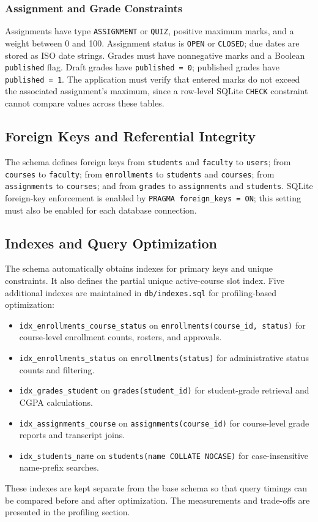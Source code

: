 \subsubsection{Assignment and Grade Constraints}
Assignments have type \texttt{ASSIGNMENT} or \texttt{QUIZ}, positive maximum marks, and a weight between 0 and 100. Assignment status is \texttt{OPEN} or \texttt{CLOSED}; due dates are stored as ISO date strings. Grades must have nonnegative marks and a Boolean \texttt{published} flag. Draft grades have \texttt{published = 0}; published grades have \texttt{published = 1}. The application must verify that entered marks do not exceed the associated assignment's maximum, since a row-level SQLite \texttt{CHECK} constraint cannot compare values across these tables.

\subsection{Foreign Keys and Referential Integrity}
The schema defines foreign keys from \texttt{students} and \texttt{faculty} to \texttt{users}; from \texttt{courses} to \texttt{faculty}; from \texttt{enrollments} to \texttt{students} and \texttt{courses}; from \texttt{assignments} to \texttt{courses}; and from \texttt{grades} to \texttt{assignments} and \texttt{students}. SQLite foreign-key enforcement is enabled by \texttt{PRAGMA foreign\_keys = ON}; this setting must also be enabled for each database connection.

\subsection{Indexes and Query Optimization}
The schema automatically obtains indexes for primary keys and unique constraints. It also defines the partial unique active-course slot index. Five additional indexes are maintained in \texttt{db/indexes.sql} for profiling-based optimization:
\begin{itemize}
    \item \texttt{idx\_enrollments\_course\_status} on \texttt{enrollments(course\_id, status)} for course-level enrollment counts, rosters, and approvals.
    \item \texttt{idx\_enrollments\_status} on \texttt{enrollments(status)} for administrative status counts and filtering.
    \item \texttt{idx\_grades\_student} on \texttt{grades(student\_id)} for student-grade retrieval and CGPA calculations.
    \item \texttt{idx\_assignments\_course} on \texttt{assignments(course\_id)} for course-level grade reports and transcript joins.
    \item \texttt{idx\_students\_name} on \texttt{students(name COLLATE NOCASE)} for case-insensitive name-prefix searches.
\end{itemize}
These indexes are kept separate from the base schema so that query timings can be compared before and after optimization. The measurements and trade-offs are presented in the profiling section.


